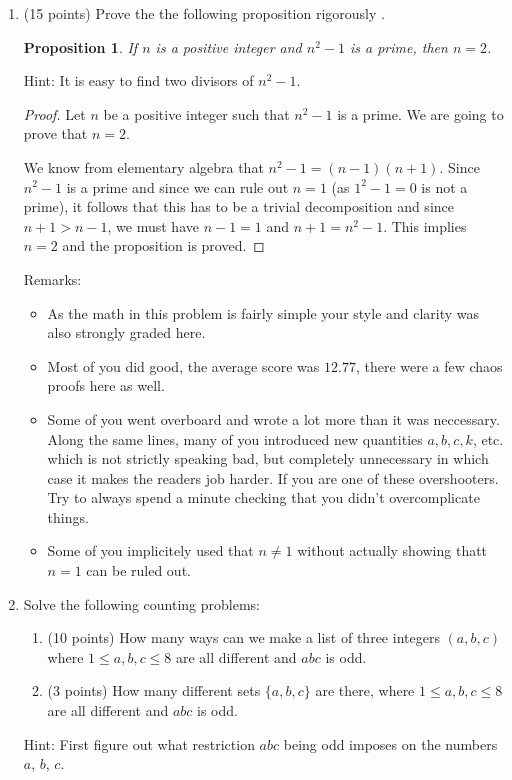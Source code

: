 \documentclass[12pt]{article}
\newtheorem*{proposition}{Proposition}
\begin{document}
\begin{enumerate}
\item (15 points) Prove  the the following proposition rigorously .
\begin{proposition}
If $n$ is a positive integer and $n^2-1$ is a prime, then $n=2$.
\end{proposition}
Hint: It is easy to find two divisors of $n^2-1$. 

\begin{proof}
Let $n$ be a positive integer such that $n^2-1$ is a prime. We are going to prove that $n=2$.

We know from elementary algebra that $n^2-1=(n-1)(n+1)$. Since $n^2-1$ is a prime and since we can rule out $n=1$ (as $1^2-1=0$ is not a prime), it follows that this has to be a trivial decomposition and since $n+1>n-1$, we must have $n-1=1$ and $n+1=n^2-1$. This implies $n=2$ and the proposition is proved.
\end{proof}

Remarks:
\begin{itemize}
\item As the math in this problem is fairly simple your style and clarity was also strongly graded here.
\item Most of you did good, the average score was $12.77$, there were a few chaos proofs here as well.
\item Some of you went overboard and wrote a lot more than it was neccessary. Along the same lines, many of you introduced new quantities $a,b,c,k$, etc. which is not strictly speaking bad, but completely unnecessary in which case it makes the readers job harder. If you are one of these overshooters. Try to always spend a minute checking that you didn't overcomplicate things.
\item Some of you implicitely used that $n\neq 1$ without actually showing thatt $n=1$ can be ruled out.
\end{itemize}
\newpage
\item Solve the following counting problems:
\begin{enumerate}
\item (10 points) How many ways can we make a list of three integers $(a,b,c)$ where $1\leq a,b,c\leq 8$ are all different and $abc$ is odd.
\item (3 points) How many different sets $\{a,b,c\}$ are there, where $1\leq a,b,c\leq 8$ are all different and $abc$ is odd.
\end{enumerate}
Hint: First figure out what restriction $abc$ being odd imposes on the numbers $a$, $b$, $c$.


\end{enumerate}
\end{document}
